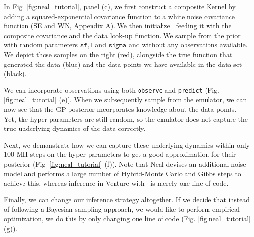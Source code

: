 In Fig. \ref{fig:neal_tutorial}, panel (c), we first construct a composite Kernel by adding a squared-exponential
covariance function to a white noise covariance function (SE and WN, Appendix A).
We then initialize \gpmem\ feeding it with the composite covariance and the data look-up function. 
We sample from the prior with random parameters $\texttt{sf,l}$ and $\texttt{sigma}$ and 
without any observations available.
We depict those samples on the right (red), alongside the true function that generated the data (blue) and
the data points we have available in the data set (black).

We can incorporate observations using both \texttt{observe} and \texttt{predict} (Fig. \ref{fig:neal_tutorial} (e)).
When we subsequently sample from the emulator, we can now see that the \ac{GP} posterior incorporates knowledge 
about the data points. Yet, the hyper-parameters are still random, so the emulator does not capture the true
underlying dynamics of the data correctly. 

Next, we demonstrate how we can capture these underlying dynamics within only 100 \ac{MH} steps on the hyper-parameters to get a good approximation for their posterior (Fig. \ref{fig:neal_tutorial} (f)).
Note that Neal devises an additional noise model and performs a large number of Hybrid-Monte Carlo and Gibbs steps to achieve this, whereas inference in Venture with \gpmem\ is merely one line of code. 

Finally, we can change our inference strategy altogether. If we decide that instead of following a Bayesian sampling approach,
we would like to perform empirical optimization, we do this by only changing one line of code (Fig. \ref{fig:neal_tutorial} (g)). 

